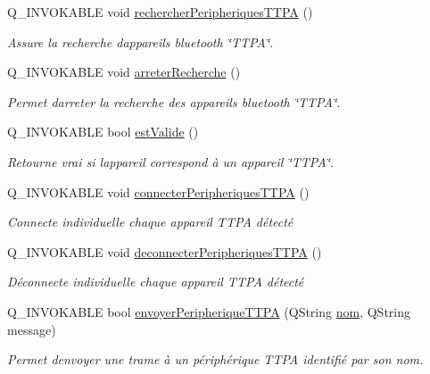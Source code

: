 \begin{DoxyCompactItemize}
\item 
Q\+\_\+\+I\+N\+V\+O\+K\+A\+B\+LE void \hyperlink{class_communication_bluetooth_a4c2e2d557728c227faeb247cb8a9c482}{rechercher\+Peripheriques\+T\+T\+PA} ()
\begin{DoxyCompactList}\small\item\em Assure la recherche d\textquotesingle{}appareils bluetooth \char`\"{}\+T\+T\+P\+A\char`\"{}. \end{DoxyCompactList}\item 
Q\+\_\+\+I\+N\+V\+O\+K\+A\+B\+LE void \hyperlink{class_communication_bluetooth_ab9993bd24a2f0c8254564a36cdf16069}{arreter\+Recherche} ()
\begin{DoxyCompactList}\small\item\em Permet d\textquotesingle{}arreter la recherche des appareils bluetooth \char`\"{}\+T\+T\+P\+A\char`\"{}. \end{DoxyCompactList}\item 
Q\+\_\+\+I\+N\+V\+O\+K\+A\+B\+LE bool \hyperlink{class_communication_bluetooth_a69f544bb71f5287689ee051511811669}{est\+Valide} ()
\begin{DoxyCompactList}\small\item\em Retourne vrai si l\textquotesingle{}appareil correspond à un appareil \char`\"{}\+T\+T\+P\+A\char`\"{}. \end{DoxyCompactList}\item 
Q\+\_\+\+I\+N\+V\+O\+K\+A\+B\+LE void \hyperlink{class_communication_bluetooth_a321073d9dc26aad4b34ecf41a1dee8a4}{connecter\+Peripheriques\+T\+T\+PA} ()
\begin{DoxyCompactList}\small\item\em Connecte individuelle chaque appareil T\+T\+PA détecté \end{DoxyCompactList}\item 
Q\+\_\+\+I\+N\+V\+O\+K\+A\+B\+LE void \hyperlink{class_communication_bluetooth_aacfffa47d72f3ab5ab554001d5f38fd1}{deconnecter\+Peripheriques\+T\+T\+PA} ()
\begin{DoxyCompactList}\small\item\em Déconnecte individuelle chaque appareil T\+T\+PA détecté \end{DoxyCompactList}\item 
Q\+\_\+\+I\+N\+V\+O\+K\+A\+B\+LE bool \hyperlink{class_communication_bluetooth_a73d95b841bf64a4463760435a41fc219}{envoyer\+Peripherique\+T\+T\+PA} (Q\+String \hyperlink{class_communication_bluetooth_a320cc60a0cb6b4ea9e009fef2853f1d2}{nom}, Q\+String message)
\begin{DoxyCompactList}\small\item\em Permet d\textquotesingle{}envoyer une trame à un périphérique T\+T\+PA identifié par son nom. \end{DoxyCompactList}\item 

\end{DoxyCompactItemize}
